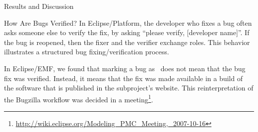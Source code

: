 \begin{section}{Results and Discussion}
\begin{subsection}{How Are Bugs Verified?}
	In Eclipse/Platform, the developer who fixes a bug often asks someone else to verify the fix, by asking ``please verify, [developer name]''. If the bug is reopened, then the fixer and the verifier exchange roles. This behavior illustrates a structured bug fixing/verification process.
	
	In Eclipse/EMF, we found that marking a bug as \VERIFIED\ does not mean that the bug fix was verified. Instead, it means that the fix was made available in a build of the software that is published in the subproject's website. This reinterpretation of the Bugzilla workflow was decided in a meeting\footnote{\url{http://wiki.eclipse.org/Modeling_PMC_Meeting,_2007-10-16}}.


	





\end{subsection}
\end{section}
